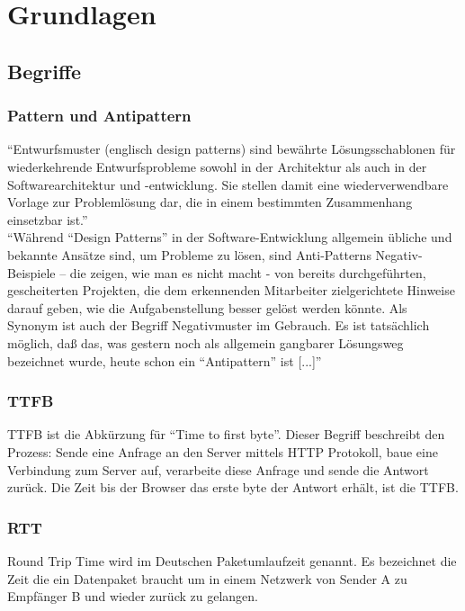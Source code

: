 \section{Grundlagen} %
\label{sec:grundlagen}

	\subsection{Begriffe}
	\label{sub:begriffe}
		\subsubsection{Pattern und Antipattern} %
		\label{ssub:pattern_und_anti_pattern}
			"`Entwurfsmuster (englisch design patterns) sind bewährte Lösungsschablonen für wiederkehrende Entwurfsprobleme sowohl in der Architektur als auch in der Softwarearchitektur und -entwicklung. Sie stellen damit eine wiederverwendbare Vorlage zur Problemlösung dar, die in einem bestimmten Zusammenhang einsetzbar ist."'\autocite{pattern15}
			\\
			"`Während "`Design Patterns"' in der Software-Entwicklung allgemein übliche und bekannte Ansätze sind, um Probleme zu lösen, sind Anti-Patterns Negativ-Beispiele – die zeigen, wie man es nicht macht - von bereits durchgeführten, gescheiterten Projekten, die dem erkennenden Mitarbeiter zielgerichtete Hinweise darauf geben, wie die Aufgabenstellung besser gelöst werden könnte. Als Synonym ist auch der Begriff Negativmuster im Gebrauch. Es ist tatsächlich möglich, daß das, was gestern noch als allgemein gangbarer Lösungsweg bezeichnet wurde, heute schon ein "`Antipattern"' ist [...]"' \autocite{Stepken06}


		\subsubsection{TTFB} %
		\label{ssub:ttfb}
		TTFB ist die Abkürzung für "`Time to first byte"'. Dieser Begriff beschreibt den Prozess: Sende eine Anfrage an den Server mittels HTTP Protokoll, baue eine Verbindung zum Server auf, verarbeite diese Anfrage und sende die Antwort zurück. Die Zeit bis der Browser das erste byte der Antwort erhält, ist die TTFB.

		\subsubsection{RTT} %
		\label{ssub:rtt}
			Round Trip Time wird im Deutschen Paketumlaufzeit genannt. Es bezeichnet die Zeit die ein Datenpaket braucht um in einem Netzwerk von Sender A zu Empfänger B und wieder zurück zu gelangen.

